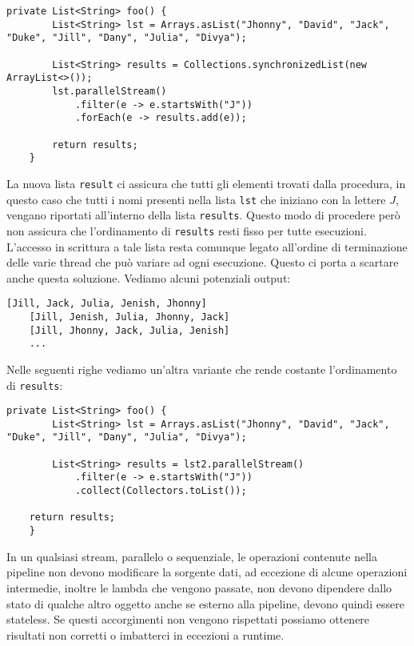 			\begin{lstlisting}[breaklines=true]
	private List<String> foo() {
		List<String> lst = Arrays.asList("Jhonny", "David", "Jack", "Duke", "Jill", "Dany", "Julia", "Divya");
		
		List<String> results = Collections.synchronizedList(new ArrayList<>());
		lst.parallelStream()
			.filter(e -> e.startsWith("J"))
			.forEach(e -> results.add(e));
		
		return results;
	}
			\end{lstlisting}
			La nuova lista \lstinline|result| ci assicura che tutti gli elementi trovati dalla procedura, in questo caso che tutti i nomi presenti nella lista \lstinline|lst| che iniziano con la lettere $J$, vengano riportati all'interno della lista \lstinline|results|. Questo modo di procedere però non assicura che l'ordinamento di \lstinline|results| resti fisso per tutte esecuzioni. L'accesso in scrittura a tale lista resta comunque legato all'ordine di terminazione delle varie thread che può variare ad ogni esecuzione. Questo ci porta a scartare anche questa soluzione. Vediamo alcuni potenziali output:
			\begin{lstlisting}[numbers=none,frame=none]
	[Jill, Jack, Julia, Jenish, Jhonny]
	[Jill, Jenish, Julia, Jhonny, Jack]
	[Jill, Jhonny, Jack, Julia, Jenish]
	...
			\end{lstlisting}
			Nelle seguenti righe vediamo un'altra variante che rende costante l'ordinamento di \lstinline|results|:
			\begin{lstlisting}[breaklines=true]
	private List<String> foo() {
		List<String> lst = Arrays.asList("Jhonny", "David", "Jack", "Duke", "Jill", "Dany", "Julia", "Divya");
	
		List<String> results = lst2.parallelStream()
			.filter(e -> e.startsWith("J"))
			.collect(Collectors.toList());
	
	return results;
	}
			\end{lstlisting}
			In un qualsiasi stream, parallelo o sequenziale, le operazioni contenute nella pipeline non devono modificare la sorgente dati, ad eccezione di alcune operazioni intermedie, inoltre le lambda che vengono passate, non devono dipendere dallo stato di qualche altro oggetto anche se esterno alla pipeline, devono quindi essere stateless. Se questi accorgimenti non vengono rispettati possiamo ottenere risultati non corretti o imbatterci in eccezioni a runtime.
			
